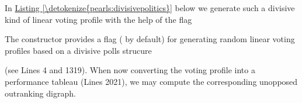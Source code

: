 \documentclass[a4paper,12pt,english]{sphinxhowto}
\begin{document}
\sphinxAtStartPar
In \hyperref[\detokenize{pearls:divisivepolitics}]{Listing \ref{\detokenize{pearls:divisivepolitics}}} below we generate such a divisive kind of linear voting profile with the help of the  flag  %
\begin{footnote}[5]\sphinxAtStartFootnote
The  constructor provides a  flag ( by default) for generating random linear voting profiles based on a divisive polls strucure
%
\end{footnote} (see Lines 4 and 13\sphinxhyphen{}19). When now converting the voting profile into a performance tableau (Lines 20\sphinxhyphen{}21), we may compute the corresponding unopposed outranking digraph.
\def\sphinxLiteralBlockLabel{\label{\detokenize{pearls:divisivepolitics}}}
%
\end{document}
